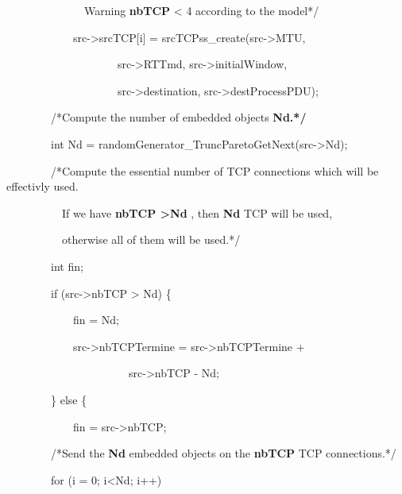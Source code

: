\documentclass[a4paper]{article}
\begin{document}
{
\ \ \ \ \ \ \ \ \ \ \ \ \ \ Warning \textbf{nbTCP} {\textless} 4 according to the model*/}

{
\ \ \ \ \ \ \ \ \ \ \ \ src-{\textgreater}srcTCP[i] = srcTCPss\_create(src-{\textgreater}MTU,}

{
\ \ \ \ \ \ \ \ \ \ \ \ \ \ \ \ \ \ \ \ src-{\textgreater}RTTmd, src-{\textgreater}initialWindow,}

{
\ \ \ \ \ \ \ \ \ \ \ \ \ \ \ \ \ \ \ \ src-{\textgreater}destination, src-{\textgreater}destProcessPDU);}

\bigskip

{
\ \ \ \ \ \ \ \ /*Compute the number of embedded objects \textbf{Nd.*/}}

{
\ \ \ \ \ \ \ \ int Nd = randomGenerator\_TruncParetoGetNext(src-{\textgreater}Nd);}

\bigskip

{
\ \ \ \ \ \ \ \ /*Compute the essential number of TCP connections which will be effectivly used.}

{
\ \ \ \ \ \ \ \ \ \ If we have \textbf{nbTCP {\textgreater}Nd }, then \textbf{Nd }TCP will be used,}

{
\ \ \ \ \ \ \ \ \ \ otherwise all of them will be used.*/}

{
\ \ \ \ \ \ \ \ int fin;}

{
\ \ \ \ \ \ \ \ if (src-{\textgreater}nbTCP {\textgreater} Nd) \{}

{
\ \ \ \ \ \ \ \ \ \ \ \ fin = Nd;}

{
\ \ \ \ \ \ \ \ \ \ \ \ src-{\textgreater}nbTCPTermine = src-{\textgreater}nbTCPTermine +}

{
\ \ \ \ \ \ \ \ \ \ \ \ \ \ \ \ \ \ \ \ \ \ src-{\textgreater}nbTCP - Nd;}

{
\ \ \ \ \ \ \ \ \} else \{}

{
\ \ \ \ \ \ \ \ \ \ \ \ fin = src-{\textgreater}nbTCP;}

\bigskip

{
\ \ \ \ \ \ \ \ /*Send the \textbf{Nd }embedded objects on the \textbf{nbTCP }TCP connections.*/}

{
\ \ \ \ \ \ \ \ for (i = 0; i{\textless}Nd; i++) }
\end{document}
